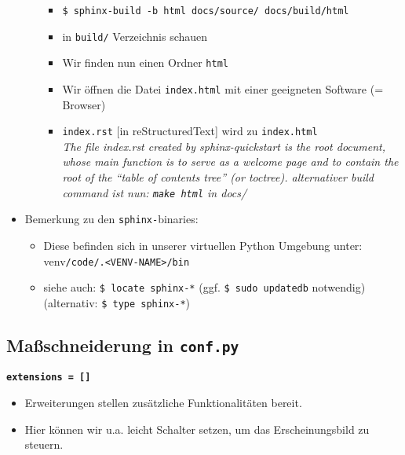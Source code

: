 \begin{itemize}
\begin{itemize}
	\begin{itemize}
		
		\item
		\texttt{\$ sphinx-build\ -b\ html\ docs/source/\ docs/build/html}
		\item
		in \texttt{build/} Verzeichnis schauen
		\item
		Wir finden nun einen Ordner \texttt{html}
		\item
		Wir öffnen die Datei \texttt{index.html} mit einer geeigneten
		Software (= Browser)
		\item
		\texttt{index.rst} {[}in reStructuredText{]} wird zu \texttt{index.html}\\
\textit{			The file index.rst created by sphinx-quickstart is the root
			document, whose main function is to serve as a welcome page and to
			contain the root of the ``table of contents tree'' (or toctree).
			alternativer build command ist nun: \texttt{make\ html} in docs/}
	\end{itemize}
	\end{itemize}

	\item
	Bemerkung zu den \texttt{sphinx-}binaries:
	
	\begin{itemize}
		
		\item
		Diese befinden sich in unserer virtuellen Python Umgebung unter:
		venv\texttt{/code/.\textless{}VENV-NAME\textgreater{}/bin}
		\item
		siehe auch: \texttt{\$\ locate\ sphinx-*} (ggf.
		\texttt{\$ sudo\ updatedb} notwendig) (alternativ:
		\texttt{\$ type\ sphinx-*})
	\end{itemize}
\end{itemize}

\subsection{Maßschneiderung in \texttt{conf.py}}

\textbf{\texttt{extensions\ =\ {[}{]}}}

\begin{itemize}
	
	\item
	Erweiterungen stellen zusätzliche Funktionalitäten bereit.
	\item
	Hier können wir u.a. leicht Schalter setzen, um das Erscheinungsbild zu
	steuern.
\end{itemize}

